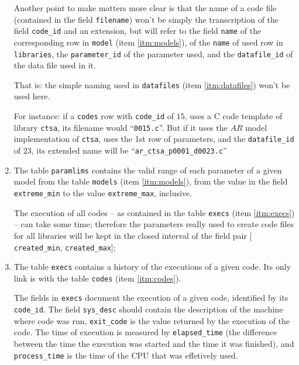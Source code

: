 \documentclass[a4paper,10pt]{article}
\begin{document}
\begin{enumerate}
        Another point to make matters more clear is that the
        name of a code file (contained in the field
        {\tt filename}) won't be simply the transcription of the
        field {\tt code\_id} and an extension, but will refer to
        the field {\tt name} of the corresponding row in
        {\tt model} (item \ref{itm:models}), of the {\tt name} of
        used row in {\tt libraries}, the {\tt parameter\_id}
        of the parameter used, and the {\tt datafile\_id} of the
        data file used in it.

        That is: the simple naming used in {\tt datafiles} (item
        \ref{itm:datafiles}) won't be used here.

        For instance: if a {\tt codes} row with {\tt code\_id}
        of $15$, uses a C code template of library {\tt ctsa},
        its filename would ``{\tt 0015.c}''. But if it uses the
        $AR$ model implementation of {\tt ctsa}, uses the 1st row
        of parameters, and the {\tt datafile\_id} of $23$, its
        extended name will be ``{\tt ar\_ctsa\_p0001\_d0023.c}''

    \item \label{itm:paramlims}
        The table {\tt paramlims} contains the valid range of
        each parameter of a given model from the table
        {\tt models} (item \ref{itm:models}), from the value
        in the field {\tt extreme\_min} to the value
        {\tt extreme\_max}, inclusive.

        The execution of all codes -- as contained in the table
        {\tt execs} (item \ref{itm:execs}) -- can take some time;
        therefore the parameters really used to create code files
        for all libraries will be kept in the closed interval of
        the field pair
        $[${\tt created\_min}, {\tt created\_max}$]$;

    \item \label{itm:execs}
        The table {\tt execs} contains a history of the executions
        of a given code. Its only link is with the table
        {\tt codes} (item \ref{itm:codes}).


        The fields in {\tt execs} document the execution of a
        given code, identified by its {\tt code\_id}. The field
        {\tt sys\_desc} should contain the description of the
        machine where code was run, {\tt exit\_code} is the value
        returned by the execution of the code. The time of
        execution is measured by {\tt elapsed\_time} (the
        difference between the time the execution was started and
        the time it was finished), and {\tt process\_time} is the
        time of the CPU that was effetively used.


\end{enumerate}
\end{document}
